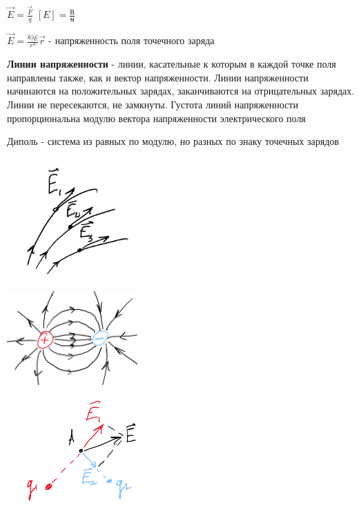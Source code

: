 \documentclass[12pt]{article}
\begin{document}
    $\vec{E} = \frac{\vec{F}}{q}$ \hfill $[E] = \frac{\text{В}}{\text{м}}$

    $\vec{E} = \frac{k|q|}{r^3}\vec{r}$ - напряженность поля точечного заряда

    \textbf{Линии напряженности} - линии, касательные к которым в каждой точке поля направлены также, как и вектор напряженности. 
    Линии напряженности начинаются на положительных зарядах, заканчиваются на отрицательных зарядах. Линии не пересекаются, не замкнуты. 
    Густота линий напряженности пропорциональна модулю вектора напряженности электрического поля

    Диполь - система из равных по модулю, но разных по знаку точечных зарядов

    \begin{multicols}{3}
        \begin{center}
            \includegraphics[width=5cm]{physics1/images/physics1_2024_11_15_4}
        \end{center}

        \begin{center}
            \includegraphics[width=5cm]{physics1/images/physics1_2024_11_15_5}
        \end{center}

        \begin{center}
            \includegraphics[width=5cm]{physics1/images/physics1_2024_11_15_6}
        \end{center}
    \end{multicols}
\end{document}
